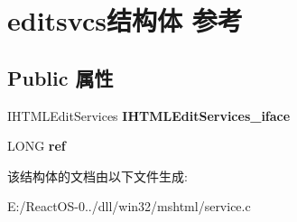 \hypertarget{structeditsvcs}{}\section{editsvcs结构体 参考}
\label{structeditsvcs}
\subsection*{Public 属性}
\begin{DoxyCompactItemize}
\item 
\mbox{\label{structeditsvcs_ab30b37639aa26ab36bb8b2389a8675f1}} 
I\+H\+T\+M\+L\+Edit\+Services {\bfseries I\+H\+T\+M\+L\+Edit\+Services\+\_\+iface}
\item 
\mbox{\label{structeditsvcs_a4471ceb0b9bb8faea8addee5b37c122e}} 
L\+O\+NG {\bfseries ref}
\end{DoxyCompactItemize}


该结构体的文档由以下文件生成\+:\begin{DoxyCompactItemize}
\item 
E\+:/\+React\+O\+S-\/0../dll/win32/mshtml/service.\+c\end{DoxyCompactItemize}
